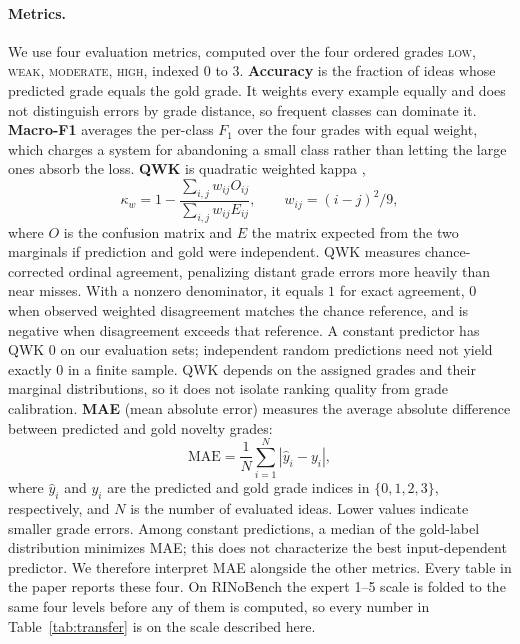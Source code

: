 \paragraph{Metrics.}
We use four evaluation metrics, computed over the four
ordered grades \textsc{low}, \textsc{weak}, \textsc{moderate}, \textsc{high},
indexed $0$ to $3$. \textbf{Accuracy} is the fraction of ideas whose predicted
grade equals the gold grade. It weights every example equally and does not
distinguish errors by grade distance, so frequent classes can dominate it.
\textbf{Macro-F1} averages the per-class $F_1$ over the four grades with
equal weight, which charges a system for abandoning a small class rather than
letting the large ones absorb the loss. \textbf{QWK} is quadratic weighted
kappa \citep{cohen1968weighted},
\begin{equation*}
 \kappa_w = 1 - \frac{\sum_{i,j} w_{ij} O_{ij}}{\sum_{i,j} w_{ij} E_{ij}},
 \qquad w_{ij} = (i-j)^2/9,
\end{equation*}
where $O$ is the confusion matrix and $E$ the matrix expected from the two
marginals if prediction and gold were independent. QWK measures
chance-corrected ordinal agreement, penalizing distant grade errors more
heavily than near misses. With a nonzero denominator, it equals $1$ for exact
agreement, $0$ when observed weighted disagreement matches the chance
reference, and is negative when disagreement exceeds that reference.
A constant predictor has QWK $0$ on our evaluation sets; independent random
predictions need not yield exactly $0$ in a finite sample. QWK depends on the
assigned grades and their marginal distributions, so it does not isolate
ranking quality from grade calibration.
\textbf{MAE} (mean absolute error) measures the average absolute difference
between predicted and gold novelty grades:
\begin{equation*}
 \mathrm{MAE}=\frac{1}{N}\sum_{i=1}^{N}|\widehat y_i-y_i|,
\end{equation*}
where $\widehat y_i$ and $y_i$ are the predicted and gold grade indices in
$\{0,1,2,3\}$, respectively, and $N$ is the number of evaluated ideas.
Lower values indicate smaller grade errors. Among constant predictions, a median of the
gold-label distribution minimizes MAE; this does not characterize the best
input-dependent predictor. We therefore interpret MAE alongside the other
metrics. Every table in the paper reports these four. On RINoBench the expert
1--5 scale is folded to the same four levels before any of them is computed, so
every number in Table~\ref{tab:transfer} is on the scale described here.

